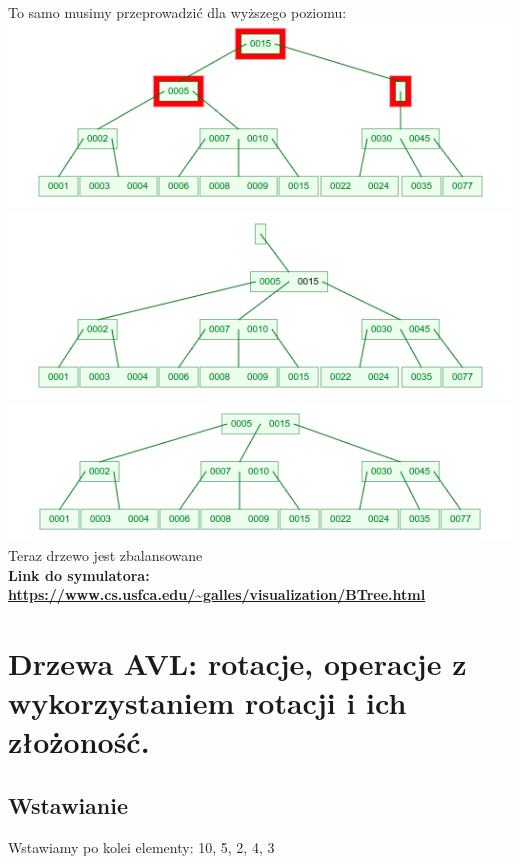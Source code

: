 \documentclass[12pt]{article}
\begin{document}
	\noindent To samo musimy przeprowadzić dla wyższego poziomu: \\
	\includegraphics[width=\linewidth]{graphics/b-trees/delete/rebalance-06.png} \\
	\includegraphics[width=\linewidth]{graphics/b-trees/delete/rebalance-07.png} \\
	\includegraphics[width=\linewidth]{graphics/b-trees/delete/rebalance-08.png} \\

	\noindent Teraz drzewo jest zbalansowane \\

	\noindent \textbf{Link do symulatora: \url{https://www.cs.usfca.edu/~galles/visualization/BTree.html}}

	\newpage


    \section{Drzewa AVL: rotacje, operacje z wykorzystaniem rotacji i ich złożoność.}
	\subsection{Wstawianie}
	Wstawiamy po kolei elementy: 10, 5, 2, 4, 3 \\
\end{document}
